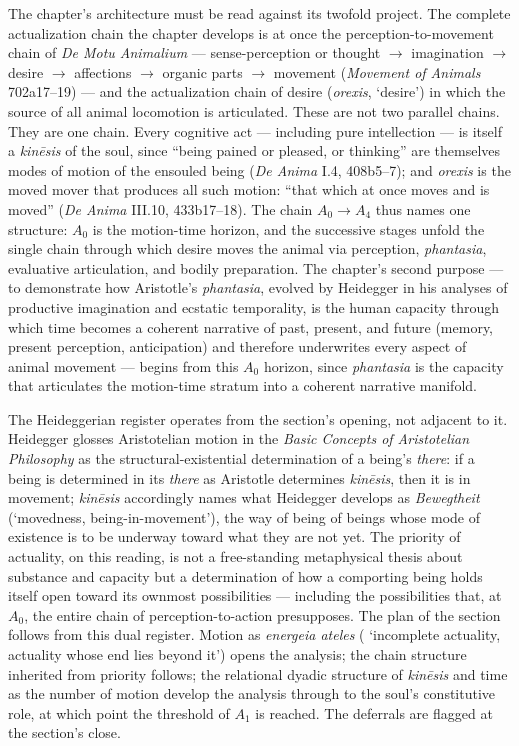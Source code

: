 The chapter's architecture must be read against its twofold project. The complete actualization chain the chapter develops is at once the perception-to-movement chain of \textit{De Motu Animalium} --- sense-perception or thought $\rightarrow$ imagination $\rightarrow$ desire $\rightarrow$ affections $\rightarrow$ organic parts $\rightarrow$ movement (\textit{Movement of Animals} 702a17--19) --- and the actualization chain of desire (\textit{orexis},  `desire') in which the source of all animal locomotion is articulated. These are not two parallel chains. They are one chain. Every cognitive act --- including pure intellection --- is itself a \textit{kinēsis} of the soul, since ``being pained or pleased, or thinking'' are themselves modes of motion of the ensouled being (\textit{De Anima} I.4, 408b5--7); and \textit{orexis} is the moved mover that produces all such motion: ``that which at once moves and is moved'' (\textit{De Anima} III.10, 433b17--18). The chain $A_0 \rightarrow A_4$ thus names one structure: $A_0$ is the motion-time horizon, and the successive stages unfold the single chain through which desire moves the animal via perception, \textit{phantasia}, evaluative articulation, and bodily preparation. The chapter's second purpose --- to demonstrate how Aristotle's \textit{phantasia}, evolved by Heidegger in his analyses of productive imagination and ecstatic temporality, is the human capacity through which time becomes a coherent narrative of past, present, and future (memory, present perception, anticipation) and therefore underwrites every aspect of animal movement --- begins from this $A_0$ horizon, since \textit{phantasia} is the capacity that articulates the motion-time stratum into a coherent narrative manifold.

The Heideggerian register operates from the section's opening, not adjacent to it. Heidegger glosses Aristotelian motion in the \textit{Basic Concepts of Aristotelian Philosophy} as the structural-existential determination of a being's \textit{there}: if a being is determined in its \textit{there} as Aristotle determines \textit{kinēsis}, then it is in movement; \textit{kinēsis} accordingly names what Heidegger develops as \textit{Bewegtheit} (`movedness, being-in-movement'), the way of being of beings whose mode of existence is to be underway toward what they are not yet. The priority of actuality, on this reading, is not a free-standing metaphysical thesis about substance and capacity but a determination of how a comporting being holds itself open toward its ownmost possibilities --- including the possibilities that, at $A_0$, the entire chain of perception-to-action presupposes. The plan of the section follows from this dual register. Motion as \textit{energeia ateles} ( `incomplete actuality, actuality whose end lies beyond it') opens the analysis; the chain structure inherited from priority follows; the relational dyadic structure of \textit{kinēsis} and time as the number of motion develop the analysis through to the soul's constitutive role, at which point the threshold of $A_1$ is reached. The deferrals are flagged at the section's close.

